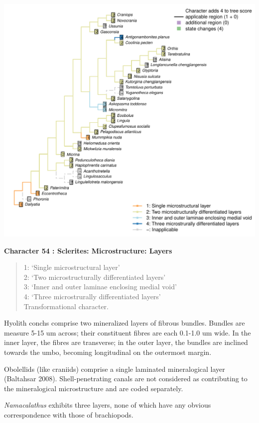 \documentclass[]{book}
\theoremstyle{definition}
\theoremstyle{definition}
\theoremstyle{definition}
\theoremstyle{remark}
\begin{document}
\includegraphics{Brachiopod_phylogeny_files/figure-latex/unnamed-chunk-5-54.pdf}

\textbf{Character 54 : Sclerites: Microstructure: Layers }

\begin{quote}
1: `Single microstructural layer'\\
2: `Two microstructurally differentiated layers'\\
3: `Inner and outer laminae enclosing medial void'\\
4: `Three microstrurally differentiated layers'\\
Transformational character.
\end{quote}

Hyolith conchs comprise two mineralized layers of fibrous bundles.
Bundles are measure 5-15 um across; their constituent fibres are each
0.1-1.0 um wide. In the inner layer, the fibres are transverse; in the
outer layer, the bundles are inclined towards the umbo, becoming
longitudinal on the outermost margin.

Obolellids (like craniids) comprise a single laminated mineralogical
layer (Baltahsar 2008). Shell-penetrating canals are not considered as
contributing to the mineralogical microstructure and are coded
separately.

\emph{Namacalathus} exhibits three layers, none of which have any
obvious correspondence with those of brachiopods.
\end{document}
